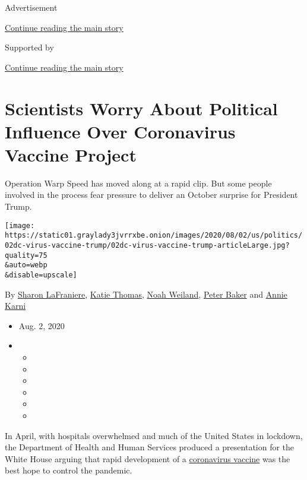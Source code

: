 Advertisement

\protect\hyperlink{after-top}{Continue reading the main story}

Supported by

\protect\hyperlink{after-sponsor}{Continue reading the main story}

\hypertarget{scientists-worry-about-political-influence-over-coronavirus-vaccine-project}{%
\section{Scientists Worry About Political Influence Over Coronavirus
Vaccine
Project}\label{scientists-worry-about-political-influence-over-coronavirus-vaccine-project}}

Operation Warp Speed has moved along at a rapid clip. But some people
involved in the process fear pressure to deliver an October surprise for
President Trump.

\texttt{[image: https://static01.graylady3jvrrxbe.onion/images/2020/08/02/us/politics/02dc-virus-vaccine-trump/02dc-virus-vaccine-trump-articleLarge.jpg?quality=75\\\&auto=webp\\\&disable=upscale]}

By \href{https://www.nytimes3xbfgragh.onion/by/sharon-lafraniere}{Sharon
LaFraniere},
\href{https://www.nytimes3xbfgragh.onion/by/katie-thomas}{Katie Thomas},
\href{https://www.nytimes3xbfgragh.onion/by/noah-weiland}{Noah Weiland},
\href{https://www.nytimes3xbfgragh.onion/by/peter-baker}{Peter Baker}
and \href{https://www.nytimes3xbfgragh.onion/by/annie-karni}{Annie
Karni}

\begin{itemize}
\item
  Aug. 2, 2020
\item
  \begin{itemize}
  \item
  \item
  \item
  \item
  \item
  \item
  \end{itemize}
\end{itemize}

In April, with hospitals overwhelmed and much of the United States in
lockdown, the Department of Health and Human Services produced a
presentation for the White House arguing that rapid development of a
\href{https://www.nytimes3xbfgragh.onion/interactive/2020/science/coronavirus-vaccine-tracker.html}{coronavirus
vaccine} was the best hope to control the pandemic.

